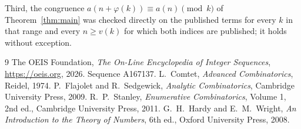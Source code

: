 \documentclass[11pt,a4paper]{article}
\theoremstyle{plain}
\theoremstyle{definition}
\begin{document}
Third, the congruence $a(n+\varphi(k))\equiv a(n)\pmod k$ of Theorem~\ref{thm:main} was
checked directly on the published terms for every $k$ in that range and every $n\ge v(k)$
for which both indices are published; it holds without exception.

\begin{thebibliography}{9}
 The OEIS Foundation, \emph{The On-Line Encyclopedia of Integer
Sequences}, \url{https://oeis.org}, 2026. Sequence A167137.
 L.~Comtet, \emph{Advanced Combinatorics}, Reidel, 1974.
 P.~Flajolet and R.~Sedgewick, \emph{Analytic Combinatorics}, Cambridge
University Press, 2009.
 R.~P.~Stanley, \emph{Enumerative Combinatorics}, Volume 1, 2nd ed.,
Cambridge University Press, 2011.
 G.~H.~Hardy and E.~M.~Wright, \emph{An Introduction to the Theory of
Numbers}, 6th ed., Oxford University Press, 2008.
\end{thebibliography}
\end{document}
